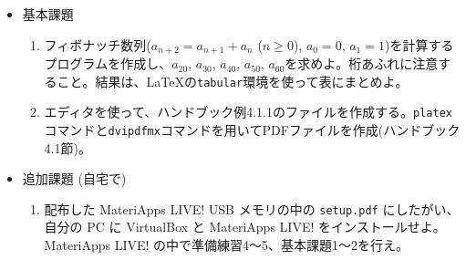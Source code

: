 \documentclass[11pt]{jarticle}
\begin{document}
\begin{itemize}
\begin{enumerate}
    {\bf また、「パスフレーズ」は忘れずに覚えておくこと。}
  \item 2.で作成した「公開鍵」を computer@exa.phys.s.u-tokyo.ac.jp あてにメールに添付して送付せよ。({\bf 間違って「秘密鍵」を送らないこと。}) メールはECCSのアカウントから送ること。その際、タイトル(サブジェクト)は「計算機実験 SSH公開鍵」、また本文中に学籍番号と氏名を明記すること。締切は「{\bf 4/8(金)17:00}」とする。
  \item エディタを使って、ハンドブック例3.1.1のファイルを作成する。Cコンパイラでコンパイルし、実行(ハンドブック3.1.1節)。
  \item ハンドブック3.1.1〜3.1.3節, 3.2.1〜3.2.2節の例題を試す。
  \end{enumerate}
\item 基本課題
  \begin{enumerate}
  \item フィボナッチ数列($a_{n+2}=a_{n+1}+a_n$ ($n \ge 0$), $a_0=0$, $a_1=1$)を計算するプログラムを作成し、$a_{20}$, $a_{30}$, $a_{40}$, $a_{50}$, $a_{60}$を求めよ。桁あふれに注意すること。結果は、\LaTeX の{\tt tabular}環境を使って表にまとめよ。
  \item エディタを使って、ハンドブック例4.1.1のファイルを作成する。{\tt platex}コマンドと{\tt dvipdfmx}コマンドを用いてPDFファイルを作成(ハンドブック4.1節)。
  \end{enumerate}
\item 追加課題 (自宅で)
  \begin{enumerate}
  \item 配布した MateriApps LIVE! USB メモリの中の {\tt setup.pdf} にしたがい、自分の PC に VirtualBox と MateriApps LIVE! をインストールせよ。MateriApps LIVE! の中で準備練習4〜5、基本課題1〜2を行え。
  \end{enumerate}
\end{itemize}
\end{document}
